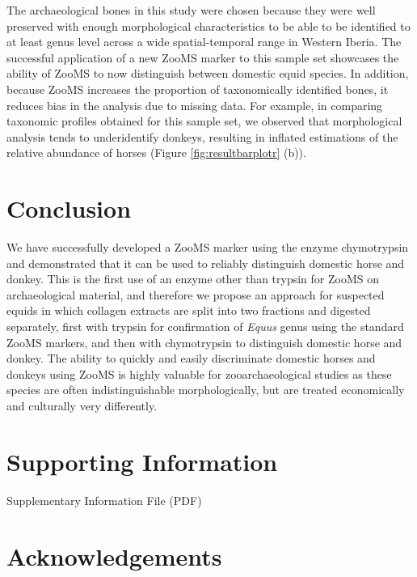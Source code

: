\documentclass[preprint, 3p, authoryear]{elsarticle} %
\begin{document}
The archaeological bones in this study were chosen because they were well preserved with enough morphological characteristics to be able to be identified to at least genus level across a wide spatial-temporal range in Western Iberia. The successful application of a new ZooMS marker to this sample set showcases the ability of ZooMS to now distinguish between domestic equid species. In addition, because ZooMS increases the proportion of taxonomically identified bones, it reduces bias in the analysis due to missing data. For example, in comparing taxonomic profiles obtained for this sample set, we observed that morphological analysis tends to underidentify donkeys, resulting in inflated estimations of the relative abundance of horses (Figure \ref{fig:resultbarplotr} (b)).

\hypertarget{conclusion}{%
\section{Conclusion}\label{conclusion}}

We have successfully developed a ZooMS marker using the enzyme chymotrypsin and demonstrated that it can be used to reliably distinguish domestic horse and donkey. This is the first use of an enzyme other than trypsin for ZooMS on archaeological material, and therefore we propose an approach for suspected equids in which collagen extracts are split into two fractions and digested separately, first with trypsin for confirmation of \emph{Equus} genus using the standard ZooMS markers, and then with chymotrypsin to distinguish domestic horse and donkey. The ability to quickly and easily discriminate domestic horses and donkeys using ZooMS is highly valuable for zooarchaeological studies as these species are often indistinguishable morphologically, but are treated economically and culturally very differently.

\hypertarget{supporting-information}{%
\section*{Supporting Information}\label{supporting-information}}

Supplementary Information File (PDF)

\hypertarget{acknowledgements}{%
\section*{Acknowledgements}\label{acknowledgements}}
\end{document}
